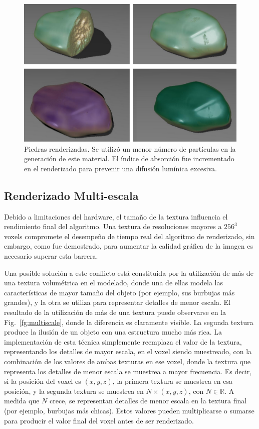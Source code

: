 \begin{figure}
  \centerline{\includegraphics[width=12cm]{figures/Fig14CAVW}}
  \caption[Piedras renderizadas]{Piedras renderizadas. Se utilizó un menor número de partículas en la generación de este material. El índice de absorción fue incrementado en el renderizado para prevenir una difusión lumínica excesiva.}
  \label{fg:Fig14}
\end{figure}

\subsection{Renderizado Multi-escala}
Debido a limitaciones del hardware, el tamaño de la textura influencia el rendimiento final del algoritmo.
Una textura de resoluciones mayores a $256^{3}$ voxels compromete el desempeño de tiempo real del algoritmo de renderizado, sin embargo, como fue demostrado, para aumentar la calidad gráfica de la imagen es necesario superar esta barrera.

Una posible solución a este conflicto está constituida por la utilización de más de una textura volumétrica en el modelado, donde una de ellas modela las características de mayor tamaño del objeto (por ejemplo, sus burbujas más grandes), y la otra se utiliza para representar detalles de menor escala.
El resultado de la utilización de más de una textura puede observarse en la Fig.~\ref{fg:multiscale}, donde la diferencia es claramente visible.
La segunda textura produce la ilusión de un objeto con una estructura mucho más rica.
La implementación de esta técnica simplemente reemplaza el valor de la textura, representando los detalles de mayor escala, en el voxel siendo muestreado, con la combinación de los valores de ambas texturas en ese voxel, donde la textura que representa los detalles de menor escala se muestrea a mayor frecuencia.
Es decir, si la posición del voxel es $(x,y,z)$, la primera textura se muestrea en esa posición, y la segunda textura se muestrea en $N\times (x, y,z)$, con $N \in \mathbb{R}$.
A medida que $N$ crece, se representan detalles de menor escala en la textura final (por ejemplo, burbujas más chicas).
Estos valores pueden multiplicarse o sumarse para producir el valor final del voxel antes de ser renderizado.

